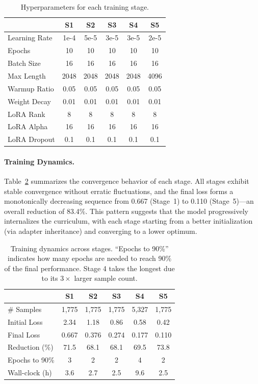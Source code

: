 \documentclass[journal]{IEEEtran}
\begin{document}
\begin{table}[!t]
\centering
\small
\begin{tabular}{lccccc}
\toprule
& \textbf{S1} & \textbf{S2} & \textbf{S3} & \textbf{S4} & \textbf{S5} \\
\midrule
Learning Rate & 1e-4 & 5e-5 & 3e-5 & 3e-5 & 2e-5 \\
Epochs & 10 & 10 & 10 & 10 & 10 \\
Batch Size & 16 & 16 & 16 & 16 & 16 \\
Max Length & 2048 & 2048 & 2048 & 2048 & 4096 \\
Warmup Ratio & 0.05 & 0.05 & 0.05 & 0.05 & 0.05 \\
Weight Decay & 0.01 & 0.01 & 0.01 & 0.01 & 0.01 \\
LoRA Rank & 8 & 8 & 8 & 8 & 8 \\
LoRA Alpha & 16 & 16 & 16 & 16 & 16 \\
LoRA Dropout & 0.1 & 0.1 & 0.1 & 0.1 & 0.1 \\
\bottomrule
\end{tabular}
\caption{Hyperparameters for each training stage.}
\label{tab:hyperparams}
\end{table}

\paragraph{Training Dynamics.}
Table~\ref{tab:training_dynamics} summarizes the convergence behavior of each stage. All stages exhibit stable convergence without erratic fluctuations, and the final loss forms a monotonically decreasing sequence from 0.667 (Stage~1) to 0.110 (Stage~5)---an overall reduction of 83.4\%. This pattern suggests that the model progressively internalizes the curriculum, with each stage starting from a better initialization (via adapter inheritance) and converging to a lower optimum.

\begin{table}[!t]
\centering
\small
\begin{tabular}{lccccc}
\toprule
& \textbf{S1} & \textbf{S2} & \textbf{S3} & \textbf{S4} & \textbf{S5} \\
\midrule
\# Samples & 1,775 & 1,775 & 1,775 & 5,327 & 1,775 \\
Initial Loss & 2.34 & 1.18 & 0.86 & 0.58 & 0.42 \\
Final Loss & 0.667 & 0.376 & 0.274 & 0.177 & 0.110 \\
Reduction (\%) & 71.5 & 68.1 & 68.1 & 69.5 & 73.8 \\
Epochs to 90\% & 3 & 2 & 2 & 4 & 2 \\
Wall-clock (h) & 3.6 & 2.7 & 2.5 & 9.6 & 2.5 \\
\bottomrule
\end{tabular}
\caption{Training dynamics across stages. ``Epochs to 90\%'' indicates how many epochs are needed to reach 90\% of the final performance. Stage 4 takes the longest due to its $3\times$ larger sample count.}
\label{tab:training_dynamics}
\end{table}
\end{document}
